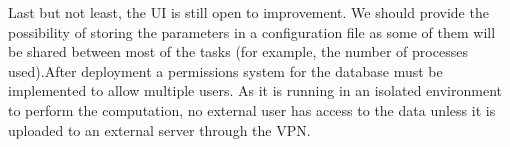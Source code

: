 \documentclass{tfg_domingo}
\begin{document}
  Last but not least, the UI is still open to improvement. We should provide the
  possibility of storing the parameters in a configuration file as some of
  them will be shared between most of the tasks (for example, the number of
  processes used).After deployment a  permissions system for the database must
  be implemented to allow multiple users. As it is  running in an isolated
  environment to perform the computation, no external user has access to the
  data unless it is uploaded to an external server through the VPN.\\







\backmatter


\end{document}
